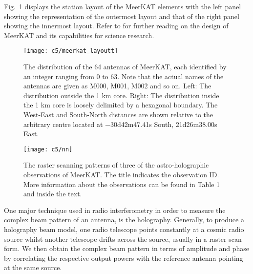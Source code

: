 Fig.~\ref{fig:meerkat_layout} displays the station layout of the MeerKAT elements with the left panel showing the representation of the outermost layout and  that of the right panel showing the innermost layout. 
\noindent Refer to \citep{jonas2018meerkat,2018PhyW...31h...8M,2018SPIE10704E..1UR,Santos:2017qgq,taylor2017mightee} for further reading on the design of MeerKAT and its capabilities for science research.

%
%
\begin{figure}[ht]
    \centering	    
    \texttt{[image: c5/meerkat\_layoutt]}	    	   
    \caption{The distribution of the 64 antennas of MeerKAT, each identified by an integer ranging from 0 to 63. Note that the actual names of the antennas are given as M000, M001, M002 and so on. Left: The distribution outside the 1 km core. Right: The distribution inside the 1 km  core is loosely delimited by a hexagonal boundary. The West-East and South-North distances are shown relative to the arbitrary centre located at −30d42m47.41s South, 21d26m38.00s East.}
	    \label{fig:meerkat_layout}
       \end{figure}
  \FloatBarrier 

 \begin{figure}[ht]
	    \centering	    
	    \texttt{[image: c5/nn]} %
	    \caption{The raster scanning patterns of three of the astro-holographic observations of MeerKAT. The title indicates the observation
ID. More information about the observations can be found in Table 1 and inside the text.}
	    \label{fig:rasterscn}
       \end{figure}
  \FloatBarrier 
% 

One major technique used in radio interferometry in order to measure the complex beam pattern of an antenna, is the holography. Generally, to produce a holography beam model, one radio telescope points constantly at a cosmic radio source whilst another telescope drifts across the source, usually in a raster scan form. We then obtain the complex beam pattern in terms of amplitude and phase by correlating the respective output powers with the reference antenna pointing at the same source. 

